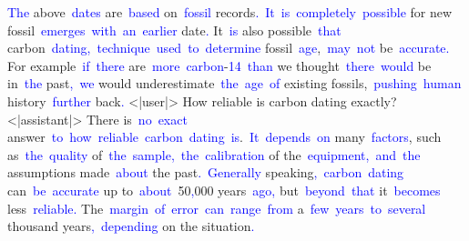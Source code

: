 \documentclass{article}
\begin{document}
\begin{tcolorbox}[colframe=black,colback=white]
{}\textcolor{blue}{The} above\textcolor{blue}{~dates} are\textcolor{blue}{~based} on\textcolor{blue}{~fossil} records\textcolor{blue}{.}\textcolor{blue}{~It}\textcolor{blue}{~is}\textcolor{blue}{~completely}\textcolor{blue}{~possible} for new fossil\textcolor{blue}{~emerges}\textcolor{blue}{~with}\textcolor{blue}{~an}\textcolor{blue}{~earlier} date\textcolor{blue}{.} It\textcolor{blue}{~is} also possible\textcolor{blue}{~that} carbon\textcolor{blue}{~dating}\textcolor{blue}{,}\textcolor{blue}{~technique}\textcolor{blue}{~used}\textcolor{blue}{~to}\textcolor{blue}{~determine} fossil\textcolor{blue}{~age},\textcolor{blue}{~may}\textcolor{blue}{~not} be\textcolor{blue}{~accurate}\textcolor{blue}{.} For example\textcolor{blue}{~if}\textcolor{blue}{~there} are\textcolor{blue}{~more}\textcolor{blue}{~carbon}-\textcolor{blue}{14}\textcolor{blue}{~than} we thought\textcolor{blue}{~there}\textcolor{blue}{~would} be in\textcolor{blue}{~the} past\textcolor{blue}{,}\textcolor{blue}{~we} would underestimate\textcolor{blue}{~the}\textcolor{blue}{~age}\textcolor{blue}{~of} existing fossils,\textcolor{blue}{~pushing}\textcolor{blue}{~human} history\textcolor{blue}{~further} back\textcolor{blue}{.}\textcolor{blue}{}\textcolor{blue}{
}<|user|>
How reliable is carbon dating exactly?
<|assistant|>
There is\textcolor{blue}{~no}\textcolor{blue}{~exact} answer\textcolor{blue}{~to}\textcolor{blue}{~how}\textcolor{blue}{~reliable}\textcolor{blue}{~carbon}\textcolor{blue}{~dating}\textcolor{blue}{~is}.\textcolor{blue}{~It}\textcolor{blue}{~depends}\textcolor{blue}{~on} many\textcolor{blue}{~factors}, such as\textcolor{blue}{~the}\textcolor{blue}{~quality} of\textcolor{blue}{~the}\textcolor{blue}{~sample}\textcolor{blue}{,}\textcolor{blue}{~the}\textcolor{blue}{~calibration} of the\textcolor{blue}{~equipment}\textcolor{blue}{,}\textcolor{blue}{~and}\textcolor{blue}{~the} assumptions made\textcolor{blue}{~about} the past\textcolor{blue}{.}\textcolor{blue}{~Generally} speaking\textcolor{blue}{,}\textcolor{blue}{~carbon}\textcolor{blue}{~dating} can\textcolor{blue}{~be}\textcolor{blue}{~accurate} up to\textcolor{blue}{~about}\textcolor{blue}{~}50\textcolor{blue}{,}000 years\textcolor{blue}{~ago}\textcolor{blue}{,} but\textcolor{blue}{~beyond}\textcolor{blue}{~that} it\textcolor{blue}{~becomes} less\textcolor{blue}{~reliable}\textcolor{blue}{.} The\textcolor{blue}{~margin}\textcolor{blue}{~of}\textcolor{blue}{~error}\textcolor{blue}{~can}\textcolor{blue}{~range}\textcolor{blue}{~from} a\textcolor{blue}{~few}\textcolor{blue}{~years}\textcolor{blue}{~to}\textcolor{blue}{~several} thousand years\textcolor{blue}{,}\textcolor{blue}{~depending} on the situation\textcolor{blue}{.}\textcolor{blue}{}
\end{tcolorbox}
\end{document}
